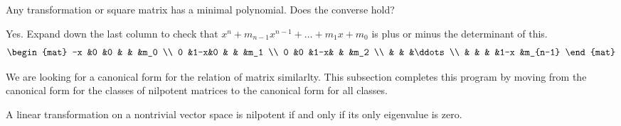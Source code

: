 \begin{exercises}
  \item
    Any transformation or square matrix has a minimal polynomial.
    Does the converse hold?
    \begin{answer}
      Yes.
      Expand down the last column to check that
      \( x^n+m_{n-1}x^{n-1}+\dots+m_1x+m_0 \) is plus or minus the
      determinant of this.
      \begin{equation*}
         \begin{mat}
            -x  &0  &0  &      &    &m_0    \\
             0  &1-x&0  &      &    &m_1    \\
             0  &0  &1-x&      &    &m_2    \\
                &   &   &\ddots             \\
                &   &   &      &1-x &m_{n-1}
         \end{mat}
      \end{equation*} 
     \end{answer}
\end{exercises}












We are looking for a canonical form for the relation of matrix similarlty.
This subsection completes this program by moving
from the canonical form for the classes 
of nilpotent matrices to
the canonical form for all classes.

\begin{lemma} \label{le:NilIffOnlyEigenZero}
A linear transformation on a nontrivial vector space 
is nilpotent if and only if its only eigenvalue is zero.
\end{lemma}

